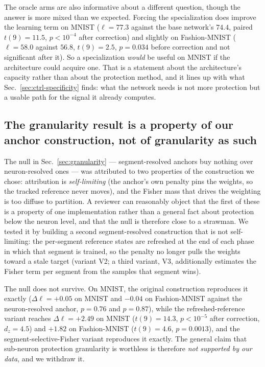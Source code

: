 \documentclass[review,12pt,number]{elsarticle}
\begin{document}
The oracle arms are also informative about a different question, though
the answer is more mixed than we expected. Forcing the specialization
does improve the learning term on MNIST ($\ell=77.3$ against the base
network's $74.4$, paired $t(9)=11.5$, $p<10^{-4}$ after correction) and
slightly on Fashion-MNIST ($\ell=58.0$ against $56.8$, $t(9)=2.5$,
$p=0.034$ before correction and not significant after it). So a
specialization \emph{would} be useful on MNIST if the architecture could
acquire one. That is a statement about the architecture's capacity rather
than about the protection method, and it lines up with what
Sec.~\ref{sec:ctrl-specificity} finds: what the network needs is not
more protection but a usable path for the signal it already computes.

\subsection{The granularity result is a property of our anchor
construction, not of granularity as such}
\label{sec:ctrl-anchor}

The null in Sec.~\ref{sec:granularity} --- segment-resolved anchors buy
nothing over neuron-resolved ones --- was attributed to two properties of
the construction we chose: attribution is \emph{self-limiting} (the
anchor's own penalty pins the weights, so the tracked reference never
moves), and the Fisher mass that drives the weighting is too diffuse to
partition. A reviewer can reasonably object that the first of these is a
property of one implementation rather than a general fact about
protection below the neuron level, and that the null is therefore close
to a strawman. We tested it by building a second segment-resolved
construction that is not self-limiting: the per-segment reference
states are refreshed at the end of each phase in which that segment is
trained, so the penalty no longer pulls the weights toward a stale
target (variant V2; a third variant, V3, additionally estimates the
Fisher term per segment from the samples that segment wins).

The null does not survive. On MNIST, the original construction reproduces
it exactly ($\Delta\ell=+0.05$ on MNIST and $-0.04$ on Fashion-MNIST
against the neuron-resolved anchor, $p=0.76$ and $p=0.87$), while the
refreshed-reference variant reaches
$\Delta\ell=+2.49$ on MNIST ($t(9)=14.3$, $p<10^{-5}$ after correction,
$d_z=4.5$) and $+1.82$ on Fashion-MNIST ($t(9)=4.6$, $p=0.0013$), and the
segment-selective-Fisher variant reproduces it exactly. The general claim that sub-neuron protection
granularity is worthless is therefore \emph{not supported by our data},
and we withdraw it.
\end{document}
